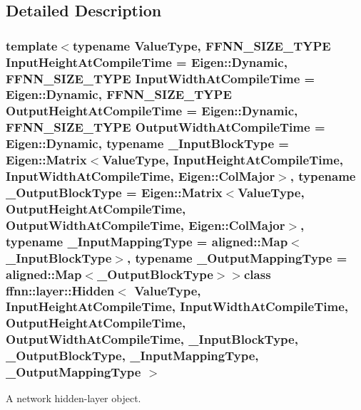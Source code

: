 \subsection{Detailed Description}
\subsubsection*{template$<$typename Value\-Type, F\-F\-N\-N\-\_\-\-S\-I\-Z\-E\-\_\-\-T\-Y\-P\-E Input\-Height\-At\-Compile\-Time = Eigen\-::\-Dynamic, F\-F\-N\-N\-\_\-\-S\-I\-Z\-E\-\_\-\-T\-Y\-P\-E Input\-Width\-At\-Compile\-Time = Eigen\-::\-Dynamic, F\-F\-N\-N\-\_\-\-S\-I\-Z\-E\-\_\-\-T\-Y\-P\-E Output\-Height\-At\-Compile\-Time = Eigen\-::\-Dynamic, F\-F\-N\-N\-\_\-\-S\-I\-Z\-E\-\_\-\-T\-Y\-P\-E Output\-Width\-At\-Compile\-Time = Eigen\-::\-Dynamic, typename \-\_\-\-Input\-Block\-Type = Eigen\-::\-Matrix$<$\-Value\-Type, Input\-Height\-At\-Compile\-Time, Input\-Width\-At\-Compile\-Time, Eigen\-::\-Col\-Major$>$, typename \-\_\-\-Output\-Block\-Type = Eigen\-::\-Matrix$<$\-Value\-Type, Output\-Height\-At\-Compile\-Time, Output\-Width\-At\-Compile\-Time, Eigen\-::\-Col\-Major$>$, typename \-\_\-\-Input\-Mapping\-Type = aligned\-::\-Map$<$\-\_\-\-Input\-Block\-Type$>$, typename \-\_\-\-Output\-Mapping\-Type = aligned\-::\-Map$<$\-\_\-\-Output\-Block\-Type$>$$>$class ffnn\-::layer\-::\-Hidden$<$ Value\-Type, Input\-Height\-At\-Compile\-Time, Input\-Width\-At\-Compile\-Time, Output\-Height\-At\-Compile\-Time, Output\-Width\-At\-Compile\-Time, \-\_\-\-Input\-Block\-Type, \-\_\-\-Output\-Block\-Type, \-\_\-\-Input\-Mapping\-Type, \-\_\-\-Output\-Mapping\-Type $>$}

A network hidden-\/layer object. 

